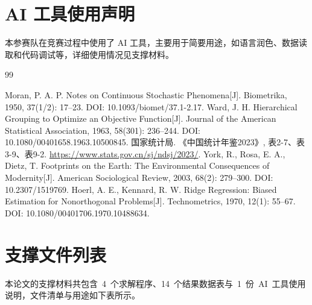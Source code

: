 \documentclass[12pt,a4paper]{ctexart}
\renewcommand{\thesection}{\chinese{section}、}
\renewcommand{\thesubsection}{\arabic{section}.\arabic{subsection}}
\renewcommand{\thesubsubsection}{\arabic{section}.\arabic{subsection}.\arabic{subsubsection}}
\theoremstyle{definition}
\theoremstyle{plain}
\theoremstyle{remark}
\begin{document}
\section*{AI 工具使用声明}
\noindent 本参赛队在竞赛过程中使用了 AI 工具，主要用于简要用途，如语言润色、数据读取和代码调试等，详细使用情况见支撑材料。

\begin{thebibliography}{99}
\raggedright
{}
 Moran, P. A. P. Notes on Continuous Stochastic Phenomena[J]. Biometrika, 1950, 37(1/2): 17--23. DOI: 10.1093/biomet/37.1-2.17.
 Ward, J. H. Hierarchical Grouping to Optimize an Objective Function[J]. Journal of the American Statistical Association, 1963, 58(301): 236--244. DOI: 10.1080/00401658.1963.10500845.
 国家统计局. 《中国统计年鉴2023》, 表2-7、表3-9、表9-2. \url{https://www.stats.gov.cn/sj/ndsj/2023/}.
 York, R., Rosa, E. A., Dietz, T. Footprints on the Earth: The Environmental Consequences of Modernity[J]. American Sociological Review, 2003, 68(2): 279--300. DOI: 10.2307/1519769.
 Hoerl, A. E., Kennard, R. W. Ridge Regression: Biased Estimation for Nonorthogonal Problems[J]. Technometrics, 1970, 12(1): 55--67. DOI: 10.1080/00401706.1970.10488634.

\end{thebibliography}

\newpage
\appendix
\renewcommand{\thesection}{附录 \Alph{section}}
\renewcommand{\thesubsection}{\Alph{section}.\arabic{subsection}}
\renewcommand{\thesubsubsection}{\Alph{section}.\arabic{subsection}.\arabic{subsubsection}}
\titleformat{\section}{\centering\heiti\zihao{-3}\bfseries}{\thesection}{1em}{}

\section{支撑文件列表}

本论文的支撑材料共包含~4~个求解程序、14~个结果数据表与~1~份~AI~工具使用说明，文件清单与用途如下表所示。
\end{document}
